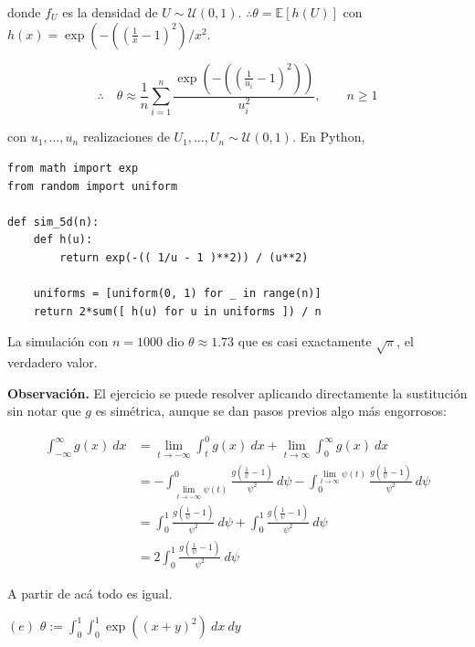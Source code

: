 \documentclass[a4paper, 12pt]{article}
\begin{document}
donde $f_U$ es la densidad de $U \sim \mathcal{U}(0, 1)$. $\therefore
\theta = \mathbb{E}\left[ h(U) \right] $ con $h(x) =
\exp\left(-\left(\left(\frac{1}{x}-1\right)^2\right) /
x^2$. 

\begin{equation*}
  \therefore \quad \theta \approx \frac{1}{n}\sum_{i=1}^n 
  \frac{\exp\left(-\left(\left(\frac{1}{u_i} - 1\right)^2\right)\right)}{u_i^2}, \qquad n \geq 1
\end{equation*}

con $u_1, \ldots, u_n$ realizaciones de $U_1, \ldots, U_n \sim \mathcal{U}(0,
1)$. En Python,

\begin{verbatim}
from math import exp 
from random import uniform
  
def sim_5d(n):
    def h(u):
        return exp(-(( 1/u - 1 )**2)) / (u**2)

    uniforms = [uniform(0, 1) for _ in range(n)]
    return 2*sum([ h(u) for u in uniforms ]) / n
\end{verbatim}

La simulación con $n = 1000$ dio $\theta \approx 1.73$ que es casi exactamente
$\sqrt{\pi}$, el verdadero valor.

\begin{myframe}
\textbf{Observación.} El ejercicio se puede resolver aplicando directamente la
sustitución sin notar que $g$ es simétrica, aunque se dan pasos previos algo más
engorrosos:

\begin{align*}
  \int_{-\infty}^\infty g(x) ~ dx 
  &= \lim_{t \to -\infty}\int_t^0 g(x) ~dx +
  \lim_{t \to \infty} \int_0^\infty g(x) ~ dx \\ 
  &=-\int_{\lim_{t \to -\infty} \psi(t)}^0 \frac{ g(\frac{1}{\psi} - 1) }{\psi^2}
  ~ d\psi - \int_0^{ \lim_{t \to \infty} \psi(t)} 
  \frac{g(\frac{1}{\psi} - 1)}{\psi^2} ~ d\psi \\ 
  &=\int_0^1 \frac{g(\frac{1}{\psi} - 1)}{\psi^2} ~ d\psi + \int_0^1
  \frac{g(\frac{1}{\psi} - 1)}{\psi^2} ~ d\psi \\ 
  &= 2 \int_0^1 \frac{g(\frac{1}{\psi} - 1)}{\psi^2} ~ d\psi
\end{align*}

A partir de acá todo es igual.
\end{myframe}


\pagebreak

\begin{myframe}
$(e)$ $\theta := \int_0^1 \int_0^1 \exp(( x+y )^2) ~ dx ~ dy$
\end{myframe}
\end{document}
